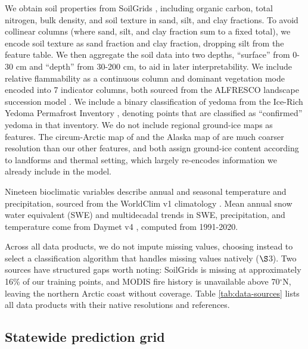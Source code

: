 \documentclass[../main.tex]{subfiles}
\begin{document}
We obtain soil properties from SoilGrids \citep{poggio2021soilgrids}, including organic carbon, total nitrogen, bulk density, and soil texture in sand, silt, and clay fractions. To avoid collinear columns (where sand, silt, and clay fraction sum to a fixed total), we encode soil texture as sand fraction and clay fraction, dropping silt from the feature table. We then aggregate the soil data into two depths, ``surface'' from 0-30 cm and ``depth'' from 30-200 cm, to aid in later interpretability. We include relative flammability as a continuous column and dominant vegetation mode encoded into 7 indicator columns, both sourced from the ALFRESCO landscape succession model \citep{alfresco}. We include a binary classification of yedoma from the Ice-Rich Yedoma Permafrost Inventory \citep{strauss2022database}, denoting points that are classified as ``confirmed'' yedoma in that inventory. We do not include regional ground-ice maps as features. The circum-Arctic map of  and the Alaska map of  are much coarser resolution than our other features, and both assign ground-ice content according to landforms and thermal setting, which largely re-encodes information we already include in the model.

Nineteen bioclimatic variables describe annual and seasonal temperature and precipitation, sourced from the WorldClim v1 climatology \citep{hijmans2005very}. Mean annual snow water equivalent (SWE) and multidecadal trends in SWE, precipitation, and temperature come from Daymet v4 \citep{thornton2022daymet}, computed from 1991-2020.

Across all data products, we do not impute missing values, choosing instead to select a classification algorithm that handles missing values natively ($\S$3). Two sources have structured gaps worth noting: SoilGrids is missing at approximately 16\% of our training points, and MODIS fire history is unavailable above 70$^\circ$N, leaving the northern Arctic coast without coverage. Table \ref{tab:data-sources} lists all data products with their native resolutions and references.

\subsection{Statewide prediction grid}
\end{document}
